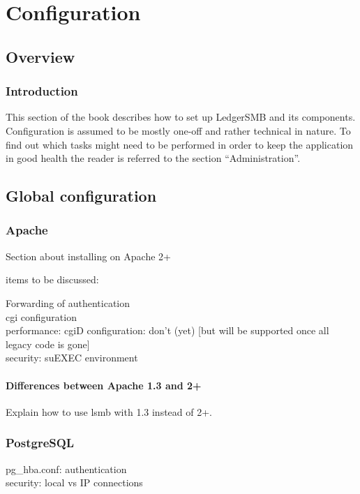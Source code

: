 

\part{Configuration}
\label{part:Configuration}


\chapter{Overview}

\section{Introduction}
This section of the book describes how to set up LedgerSMB and its components.
Configuration is assumed to be mostly one-off and rather technical in nature.  To find
out which tasks might need to be performed in order to keep the application in good
health the reader is referred to the section ``Administration''. 

\chapter{Global configuration}

\section{Apache}

Section about installing on Apache 2+

items to be discussed:

Forwarding of authentication \\
cgi configuration \\
performance: cgiD configuration: don't (yet) [but will be supported once all legacy code is gone] \\
security: suEXEC environment \\

\subsection{Differences between Apache 1.3 and 2+}

Explain how to use lsmb with 1.3 instead of 2+.

\section{PostgreSQL}

pg\_hba.conf: authentication \\
security: local vs IP connections \\




